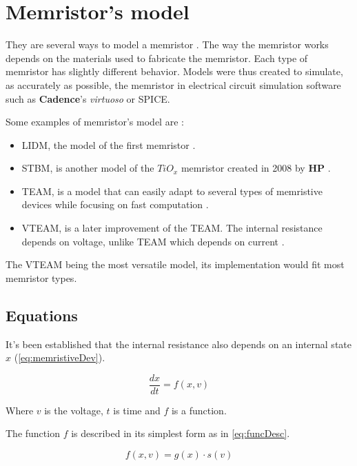 \section{Memristor's model}\label{sec:model}

They are several ways to model a memristor \cite{memristorFab,memTEAMmodel, memVTEAMmodel, memristorSpiceModels}. The way the memristor works depends on the materials used to fabricate the memristor. Each type of memristor has slightly different behavior. Models were thus created to simulate, as accurately as possible, the memristor in electrical circuit simulation software such as \textbf{Cadence}'s \textit{virtuoso} or SPICE.

Some examples of memristor's model are :

\begin{itemize}
  \item \acf{LIDM}, the model of the first memristor \cite{memristorFab}.
  \item \acf{STBM}, is another model of the $TiO_x$ memristor created in 2008 by \textbf{HP} \cite{memristorFab, memristorSpiceModels}.
  \item \acf{TEAM}, is a model that can easily adapt to several types of memristive devices while focusing on fast computation \cite{memTEAMmodel}.
  \item \acf{VTEAM}, is a later improvement of the \ac{TEAM}. The internal resistance depends on voltage, unlike \ac{TEAM} which depends on current \cite{memVTEAMmodel}.
\end{itemize}

The \ac{VTEAM} being the most versatile model, its implementation would fit most memristor types.

\subsection{Equations}

It's been established that the internal resistance also depends on an internal state $x$ (\cref{eq:memristiveDev}).

\begin{equation}
  \frac{dx}{dt}=f(x,v)
\end{equation}

Where $v$ is the voltage, $t$ is time and $f$ is a function.

The function $f$ is described in its simplest form as in \cref{eq:funcDesc}.

\begin{equation}\label{eq:funcDesc}
  f(x,v)=g(x)\cdot s(v)
\end{equation}

